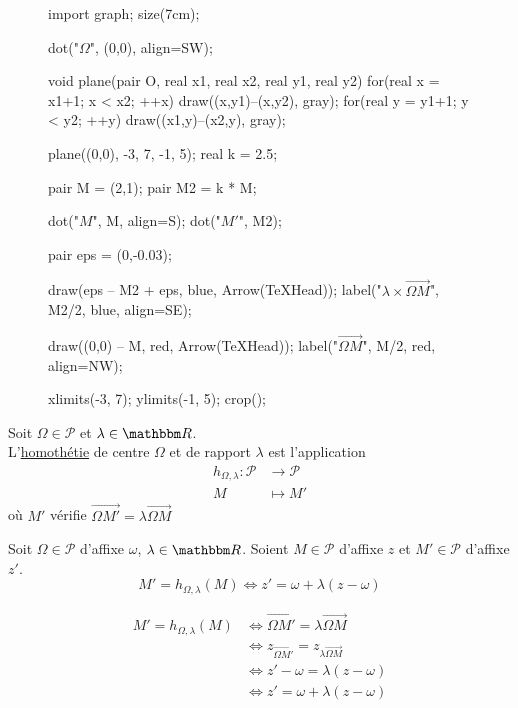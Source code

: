 \begin{defn}
	\begin{minipage}
		{\linewidth}
		\begin{wrapfigure}{r}
			{0.5\linewidth}
			\centering
			\begin{asy}
				import graph;
				size(7cm);

				dot("$\Omega$", (0,0), align=SW);

				void plane(pair O, real x1, real x2, real y1, real y2) {
					for(real x = x1+1; x < x2; ++x) draw((x,y1)--(x,y2), gray);
					for(real y = y1+1; y < y2; ++y) draw((x1,y)--(x2,y), gray);
				}

				plane((0,0), -3, 7, -1, 5);
				real k = 2.5;

				pair M = (2,1);
				pair M2 = k * M;

				dot("$M$", M, align=S);
				dot("$M'$", M2);

				pair eps = (0,-0.03);

				draw(eps -- M2 + eps, blue, Arrow(TeXHead));
				label("$\lambda\times\vec{\Omega M}$", M2/2, blue, align=SE);

				draw((0,0) -- M, red, Arrow(TeXHead));
				label("$\vec{\Omega M}$", M/2, red, align=NW);

				xlimits(-3, 7);
				ylimits(-1, 5);
				crop();
			\end{asy}
		\end{wrapfigure}

		Soit $\Omega\in \mathcal{P}$ et $\lambda\in \R$.\\
		L'\underline{homothétie} de centre $\Omega$ et de rapport $\lambda$ est l'application \begin{align*}
			h_{\Omega,\lambda}: \mathcal{P} &\longrightarrow \mathcal{P} \\
			M &\longmapsto M'
		\end{align*} où $M'$ vérifie $\vec{\Omega M'} = \lambda \vec{\Omega M}$
	\end{minipage}
\end{defn}

\begin{prop}
	Soit $\Omega \in \mathcal{P}$ d'affixe $\omega$, $\lambda \in \R$. Soient $M \in \mathcal{P}$ d'affixe $z$ et $M' \in \mathcal{P}$ d'affixe $z'$. \[
		M' = h_{\Omega,\lambda}(M) \iff z' = \omega + \lambda(z-\omega)
	\] 
\end{prop}

\begin{prv}
	\begin{align*}
		M' = h_{\Omega, \lambda}(M)
		&\iff \vec{\Omega M'} = \lambda \vec{\Omega M}\\
		&\iff z_{\vec{\Omega M'}} = z_{\lambda \vec{\Omega M}}\\
		&\iff z' - \omega = \lambda (z-\omega)\\
		&\iff z' = \omega + \lambda (z-\omega)
	\end{align*}
\end{prv}

